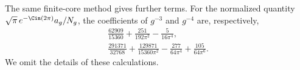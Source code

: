 \begin{rmk}\label{rmk:s04:further-coefficients}
The same finite-core method gives further terms. For the normalized
quantity $\sqrt\pi\,e^{-\Cin(2\pi)}a_g/N_g$, the coefficients of
$g^{-3}$ and $g^{-4}$ are, respectively,
\begin{gather*}
 \frac{62909}{15360}+\frac{251}{192\pi^2}-\frac5{16\pi^4},\\
 \frac{291371}{32768}+\frac{129871}{15360\pi^2}
                    -\frac{277}{64\pi^4}+\frac{105}{64\pi^6}.
\end{gather*}
We omit the details of these calculations.
\end{rmk}
